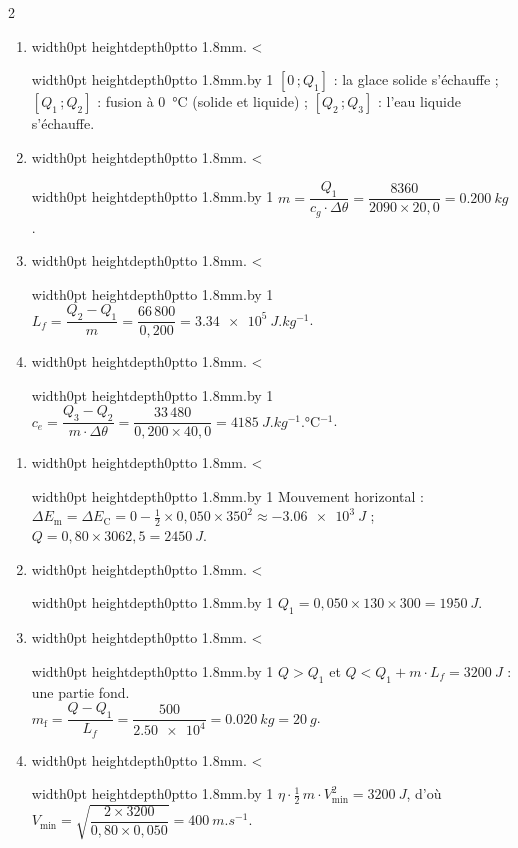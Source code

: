 \documentclass[11pt,a4paper]{article}
\newcommand{\Ec}{E_{\mathrm{C}}}
\newif\ifeleve
\newlength{\interligne}\setlength{\interligne}{7mm}
\newlength{\replen}
\newcommand{\pointilles}{{\color{cInk2!60}\leaders\hbox to 1.8mm{\hss.\hss}\hfill}\kern0pt}
\newcommand{\lignes}[1]{\leavevmode\vrule width0pt height\dimexpr\interligne-1mm\relax depth0pt\pointilles
  \lgn=1 \loop\ifnum\lgn<#1 \par\nointerlineskip\noindent\vrule width0pt height\interligne depth0pt\pointilles\advance\lgn by 1 \repeat}
\newcommand{\rep}[1]{%
  \ifeleve
    \sbox{\repbox}{\parbox{\linewidth}{#1}}%
    \replen=\dimexpr\ht\repbox+\dp\repbox\relax
    \repn=\numexpr\replen/\baselineskip+1\relax
    \ifnum\repn<2 \repn=2\fi
    \edef\nblignes{\the\repn}\lignes{\nblignes}%
  \else #1\fi}
\newcommand{\dC}[1]{\qty{#1}{\degreeCelsius}}
\newcommand{\Em}{E_{\mathrm{m}}}
\begin{document}
\begin{multicols}{2}
\begin{enumerate}[label={\sffamily\bfseries\arabic*.},leftmargin=5mm,itemsep=1pt]
  \item \rep{$[0\,;Q_1]$ : la glace solide s’échauffe ; $[Q_1\,;Q_2]$ : fusion à \dC{0} (solide et liquide) ; $[Q_2\,;Q_3]$ : l’eau liquide s’échauffe.}
  \item \rep{$m = \dfrac{Q_1}{c_g\cdot\Delta\theta} = \dfrac{8360}{2090\times20{,}0} = \qty{0,200}{kg}$.}
  \item \rep{$L_f = \dfrac{Q_2 - Q_1}{m} = \dfrac{66\,800}{0{,}200} = \qty{3,34e5}{J.kg^{-1}}$.}
  \item \rep{$c_e = \dfrac{Q_3 - Q_2}{m\cdot\Delta\theta} = \dfrac{33\,480}{0{,}200\times40{,}0} = \qty{4185}{J.kg^{-1}.\degreeCelsius^{-1}}$.}
\end{enumerate}

\begin{enumerate}[label={\sffamily\bfseries\arabic*.},leftmargin=5mm,itemsep=1pt]
  \item \rep{Mouvement horizontal : $\Delta\Em = \Delta\Ec = 0 - \frac{1}{2}\times0{,}050\times350^2 \approx \qty{-3,06e3}{J}$ ;\\ $Q = 0{,}80\times3062{,}5 = \qty{2450}{J}$.}
  \item \rep{$Q_1 = 0{,}050\times130\times300 = \qty{1950}{J}$.}
  \item \rep{$Q > Q_1$ et $Q < Q_1 + m\cdot L_f = \qty{3200}{J}$ : une partie fond.\\ $m_{\mathrm{f}} = \dfrac{Q - Q_1}{L_f} = \dfrac{500}{\num{2,50e4}} = \qty{0,020}{kg} = \qty{20}{g}$.}
  \item \rep{$\eta\cdot\frac{1}{2}\,m\cdot V_{\min}^2 = \qty{3200}{J}$, d’où $V_{\min} = \sqrt{\dfrac{2\times3200}{0{,}80\times0{,}050}} = \qty{400}{m.s^{-1}}$.}
\end{enumerate}
\end{multicols}
\end{document}
